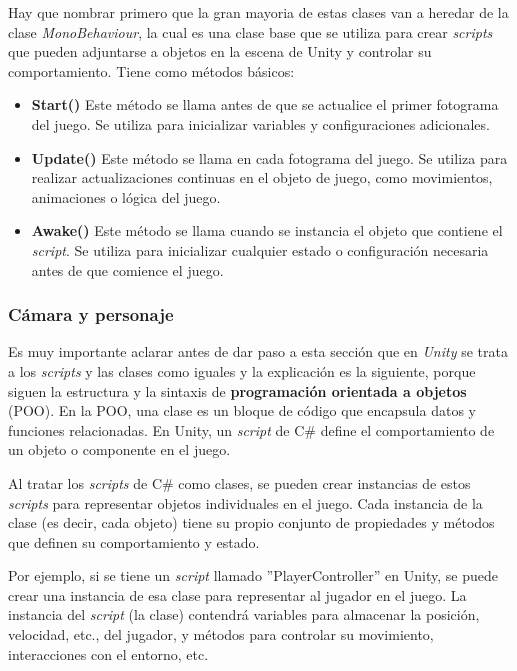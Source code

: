 Hay que nombrar primero que la gran mayoria de estas clases van a heredar de la clase \textit{MonoBehaviour}, la cual es una clase base que se utiliza para crear \textit{scripts} que pueden adjuntarse a objetos en la escena de Unity y controlar su comportamiento. Tiene como métodos básicos:

\begin{itemize}    
    \item \textbf{Start()} Este método se llama antes de que se actualice el primer fotograma del juego. Se utiliza para inicializar variables y configuraciones adicionales.
   
    \item \textbf{Update()} Este método se llama en cada fotograma del juego. Se utiliza para realizar actualizaciones continuas en el objeto de juego, como movimientos, animaciones o lógica del juego.

    \item \textbf{Awake()}  Este método se llama cuando se instancia el objeto que contiene el \textit{script}. Se utiliza para inicializar cualquier estado o configuración necesaria antes de que comience el juego.
\end{itemize}

\subsubsection{Cámara y personaje}

Es muy importante aclarar antes de dar paso a esta sección que en \textit{Unity} se trata a los \textit{scripts} y las clases como iguales y la explicación es la siguiente, porque siguen la estructura y la sintaxis de \textbf{programación orientada a objetos} (POO). En la POO, una clase es un bloque de código que encapsula datos y funciones relacionadas. En Unity, un \textit{script} de C\# define el comportamiento de un objeto o componente en el juego.

Al tratar los \textit{scripts} de C\# como clases, se pueden crear instancias de estos \textit{scripts} para representar objetos individuales en el juego. Cada instancia de la clase (es decir, cada objeto) tiene su propio conjunto de propiedades y métodos que definen su comportamiento y estado.

Por ejemplo, si se tiene un \textit{script} llamado ''PlayerController'' en Unity, se puede crear una instancia de esa clase para representar al jugador en el juego. La instancia del \textit{script} (la clase) contendrá variables para almacenar la posición, velocidad, etc., del jugador, y métodos para controlar su movimiento, interacciones con el entorno, etc.

